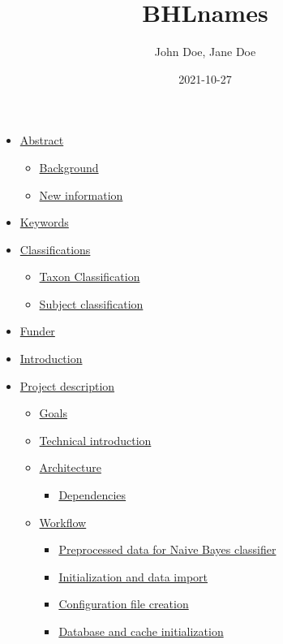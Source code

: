 \documentclass[
]{article}
\title{BHLnames}
\author{John Doe, Jane Doe}
\date{2021-10-27}
\providecommand{\tightlist}{%
  \setlength{\itemsep}{0pt}\setlength{\parskip}{0pt}}
\begin{document}
\maketitle

\begin{itemize}
\tightlist
\item
  \protect\hyperlink{abstract}{Abstract}

  \begin{itemize}
  \tightlist
  \item
    \protect\hyperlink{background}{Background}
  \item
    \protect\hyperlink{new-information}{New information}
  \end{itemize}
\item
  \protect\hyperlink{keywords}{Keywords}
\item
  \protect\hyperlink{classifications}{Classifications}

  \begin{itemize}
  \tightlist
  \item
    \protect\hyperlink{taxon-classification}{Taxon Classification}
  \item
    \protect\hyperlink{subject-classification}{Subject classification}
  \end{itemize}
\item
  \protect\hyperlink{funder}{Funder}
\item
  \protect\hyperlink{introduction}{Introduction}
\item
  \protect\hyperlink{project-description}{Project description}

  \begin{itemize}
  \tightlist
  \item
    \protect\hyperlink{goals}{Goals}
  \item
    \protect\hyperlink{technical-introduction}{Technical introduction}
  \item
    \protect\hyperlink{architecture}{Architecture}

    \begin{itemize}
    \tightlist
    \item
      \protect\hyperlink{dependencies}{Dependencies}
    \end{itemize}
  \item
    \protect\hyperlink{workflow}{Workflow}

    \begin{itemize}
    \tightlist
    \item
      \protect\hyperlink{preprocessed-data-for-naive-bayes-classifier}{Preprocessed
      data for Naive Bayes classifier}
    \item
      \protect\hyperlink{initialization-and-data-import}{Initialization
      and data import}
    \item
      \protect\hyperlink{configuration-file-creation}{Configuration file
      creation}
    \item
      \protect\hyperlink{database-and-cache-initialization}{Database and
      cache initialization}


\end{itemize}
\end{itemize}
\end{itemize}
\end{document}
